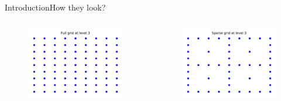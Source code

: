 \begin{frame}{Introduction}{How they look?}

    \begin{columns}
        \begin{column}{0.5\textwidth}
            \begin{figure}
                \centering
                \includegraphics[width=\textwidth]{figures/full_grid_level_3.pdf}
            \end{figure}
        \end{column}
        \begin{column}{0.5\textwidth}
            \begin{figure}
                \centering
                \includegraphics[width=\textwidth]{figures/sparse_grid_level_3.pdf}
            \end{figure}
        \end{column}
    \end{columns}

\end{frame}

